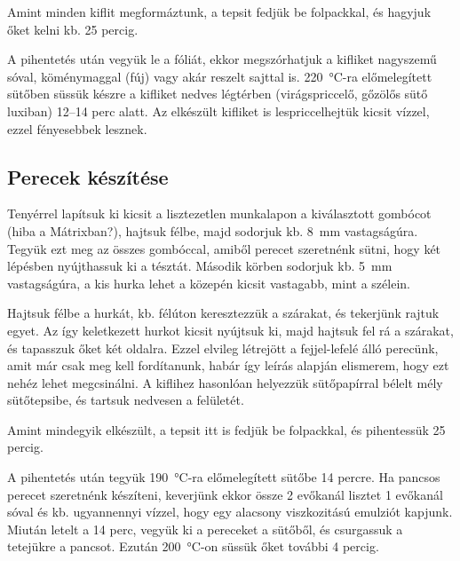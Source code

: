 Amint minden kiflit megformáztunk, a tepsit fedjük be folpackkal, és hagyjuk őket kelni kb. \num{25} percig.

A pihentetés után vegyük le a fóliát, ekkor megszórhatjuk a kifliket nagyszemű sóval, köménymaggal (fúj) vagy akár reszelt sajttal is. \qty{220}{\celsius}-ra előmelegített sütőben süssük készre a kifliket nedves légtérben (virágspriccelő, gőzölős sütő luxiban) \numrange{12}{14} perc alatt. Az elkészült kifliket is lespriccelhejtük kicsit vízzel, ezzel fényesebbek lesznek.~\cite{szabi_kifli}

\subsection*{Perecek készítése}
Tenyérrel lapítsuk ki kicsit a lisztezetlen munkalapon a kiválasztott gombócot (hiba a Mátrixban?), hajtsuk félbe, majd sodorjuk kb. \qty{8}{\mm} vastagságúra. Tegyük ezt meg az összes gombóccal, amiből perecet szeretnénk sütni, hogy két lépésben nyújthassuk ki a tésztát. Második körben sodorjuk kb. \qty{5}{\mm} vastagságúra, a kis hurka lehet a közepén kicsit vastagabb, mint a szélein.

Hajtsuk félbe a hurkát, kb. félúton keresztezzük a szárakat, és tekerjünk rajtuk egyet. Az így keletkezett hurkot kicsit nyújtsuk ki, majd hajtsuk fel rá a szárakat, és tapasszuk őket két oldalra. Ezzel elvileg létrejött a fejjel-lefelé álló perecünk, amit már csak meg kell fordítanunk, habár így leírás alapján elismerem, hogy ezt nehéz lehet megcsinálni. A kiflihez hasonlóan helyezzük sütőpapírral bélelt mély sütőtepsibe, és tartsuk nedvesen a felületét.

Amint mindegyik elkészült, a tepsit itt is fedjük be folpackkal, és pihentessük \num{25} percig.

A pihentetés után tegyük \qty{190}{\celsius}-ra előmelegített sütőbe \num{14} percre. Ha pancsos perecet szeretnénk készíteni, keverjünk ekkor össze \num{2} evőkanál lisztet \num{1} evőkanál sóval és kb. ugyannennyi vízzel, hogy egy alacsony viszkozitású emulziót kapjunk. Miután letelt a \num{14} perc, vegyük ki a pereceket a sütőből, és csurgassuk a tetejükre a pancsot. Ezután \qty{200}{\celsius}-on süssük őket további \num{4} percig.~\cite{szabi_perec}
